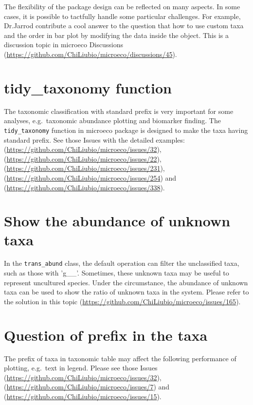 \documentclass[
]{book}
\begin{document}
The flexibility of the package design can be reflected on many aspects.
In some cases, it is possible to tactfully handle some particular challenges.
For example, Dr.Jarrod contribute a cool answer to the question that how to use custom taxa and the order in bar plot by modifying the data inside the object.
This is a discussion topic in microeco Discussions (\url{https://github.com/ChiLiubio/microeco/discussions/45}).

\section{tidy\_taxonomy function}\label{tidy_taxonomy-function}

The taxonomic classification with standard prefix is very important for some analyses,
e.g.~taxonomic abundance plotting and biomarker finding.
The \texttt{tidy\_taxonomy} function in microeco package is designed to make the taxa having standard prefix.
See those Issues with the detailed examples: (\url{https://github.com/ChiLiubio/microeco/issues/32}), (\url{https://github.com/ChiLiubio/microeco/issues/22}),
(\url{https://github.com/ChiLiubio/microeco/issues/231}), (\url{https://github.com/ChiLiubio/microeco/issues/254}) and (\url{https://github.com/ChiLiubio/microeco/issues/338}).

\section{Show the abundance of unknown taxa}\label{show-the-abundance-of-unknown-taxa}

In the \texttt{trans\_abund} class, the default operation can filter the unclassified taxa, such as those with 'g\_\_'.
Sometimes, these unknown taxa may be useful to represent uncultured species.
Under the circumstance, the abundance of unknown taxa can be used to show the ratio of unknown taxa in the system.
Please refer to the solution in this topic (\url{https://github.com/ChiLiubio/microeco/issues/165}).

\section{Question of prefix in the taxa}\label{question-of-prefix-in-the-taxa}

The prefix of taxa in taxonomic table may affect the following performance of plotting, e.g.~text in legend.
Please see those Issues (\url{https://github.com/ChiLiubio/microeco/issues/32}), (\url{https://github.com/ChiLiubio/microeco/issues/7})
and (\url{https://github.com/ChiLiubio/microeco/issues/15}).
\end{document}
